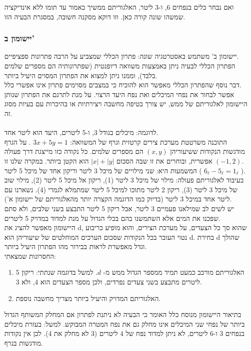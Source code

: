 ואם נבחר כלים בנפחים 6, ו-3 ליטר, האלגוריתם ממשיך כאמור עד תומו ללא אינדיקציה שמשהו שונה קורה כאן. %
וזו דוקא מסקנה חשובה, במסגרת הבעיה הזו.

\subsubsection*{יישומון ב'}
יישומון ב' משתמש באסטרטגיה שונה: פתרון הכללי שמצביע על הרבה פתרונות ספציפיים.
\\
הפתרון הכללי לבעיה ניתן באמצעות משוואה דיופנטית (שפתרונותיה הם מספרים שלמים בלבד), וממנו ניתן למצוא %
את הפתרון המסוים היעיל ביותר.
\\
דבר נוסף שהפתרון הכללי מאפשר הוא להוכיח כי במצבים מסוימים פתרון אינו  אפשרי כלל.
\\
אפשר לבחור את נפחי המיכלים ואת נפח היעד הרצוי. %
על מנת לתרגם את הפתרון שנותן היישומון לאלגוריתם של ממש, יש צורך בטיפה מחשבה ויצירתיות או בהיכרות %
עם  בעיות מסוג זה.
\\\\
לדוגמה: מיכלים בגודל 3, ו-5 ליטרים, היעד הוא ליטר אחד.
\\
התוכנה משרטטת מערכת צירים קרטזית וגרף של %
המשוואה: %
$3x+5y=1$ %
. על הגרף מודגשות הנקודות ששיעוריהן %
$(x ,y)$ %
הם מספרים שלמים. כל נקודה כזו מייצגת  דרך פעולה אפשרית, ובוחרים את זו שבה הסכום %
$ |x| + |y| $ %
הוא הקטן ביותר. במקרה שלנו זו %
$(-1, 2)$.
\\
המשמעות היא: שני מילויים של מיכל 3 ליטר וריקון אחד של מיכל 5 ליטר %
( $6_\ell - 5_\ell = 1_\ell$ ).
\\
בעיבוד לאלגוריתם פעולה: %
מילוי של מיכל 3 ליטר (1), ריקון אל מיכל 5 ליטר (2), מילוי שוב של מיכל 3 ליטר (3), ריקון 2 ליטר מתוכו למיכל %
5 ליטר שמתמלא לגמרי (4). נשארנו עם ליטר אחד במיכל 3 ליטר (בדיוק כמו הדוגמה הקצרה יותר מהאלגוריתם %
של יישומון א').
\\
יש לשים לב שמילאנו פעמיים 3 ליטר, אבל ריקון 5 ליטר התבצע בשני שלבים, ולא סתם שפכנו את המים אלא השתמשנו בהם %
בכלי הגדול על מנת למדוד במדויק 5 ליטרים.
\\
היישומון מאפשר להציג את d, שהוא סך כל הצעדים, על מערכת הצירים, והוא מופיע כריבוע נטוי העובר בכל %
הנקודות שסכום הערכים המוחלטים של שיעוריהן הוא d. בחירת d שהולך וגדל מאפשרת לראות בבירור מהו %
הפתרון היעיל ביותר.
\pagebreak
\\

החסרונות שמצאתי:
\begin{enumerate}[itemsep=-2pt, itemindent=2em] %
\item \parbox[t][2.2em][t]{424pt}{האלגוריתם מורכב כמעט תמיד ממספר הגדול ממש מ- %
$ d $. %
למשל בדוגמה שנתתי: ריקון 5 ליטרים מתבצע בשני צעדים נפרדים, ולכן מספר הצעדים הוא 4, ולא 3.}
\item \parbox[t][1.2em][t]{424pt}{האלגוריתם המדויק והיעיל ביותר מצריך מחשבה נוספת.}
\end{enumerate}
בתיאור היישומון מנוסח  כלל האומר כי הבעיה לא ניתנת לפתרון אם המחלק המשותף הגדול ביותר של נפחי %
שני המיכלים אינו מחלק גם את נפח המטרה המבוקש. למשל: בעזרת מיכלים בנפחים 3 ו-6 ליטרים, לא ניתן %
למדוד נפח של 4 ליטרים (3 לא מחלק את 4). לכן אין נקודות מודגשות בגרף. %

